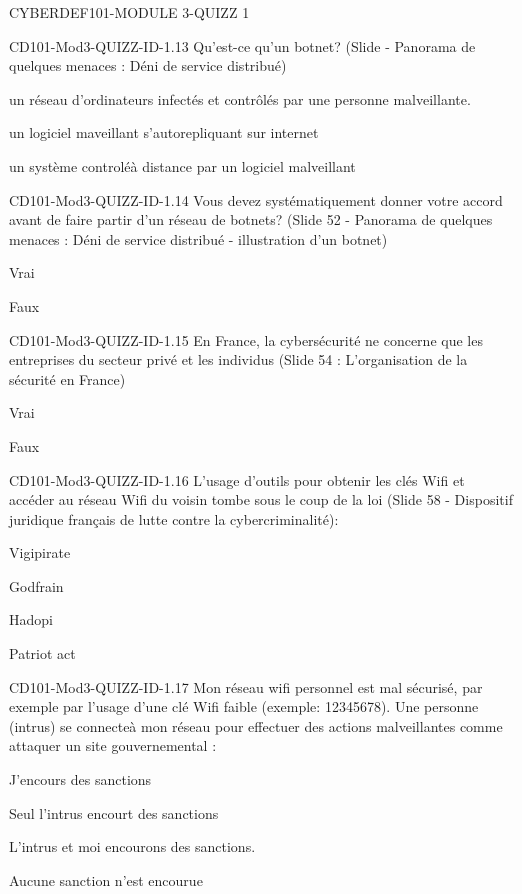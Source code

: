 \documentclass[12pt]{article}
\begin{document}
\begin{quiz}{CYBERDEF101-MODULE 3-QUIZZ 1}
\begin{multi}[multiple=true]{CD101-Mod3-QUIZZ-ID-1.13}
	Qu'est-ce qu'un botnet? (Slide -  Panorama de quelques menaces : D\'eni de service distribu\'e)
\item*  un r\'eseau d'ordinateurs infect\'es et contrôl\'es par une personne malveillante.
\item un logiciel maveillant s'autorepliquant sur internet
\item un système controlé\`a distance par un logiciel malveillant
\end{multi}

\begin{multi}[multiple=true]{CD101-Mod3-QUIZZ-ID-1.14}
	Vous devez syst\'ematiquement donner votre accord avant de faire partir d'un r\'eseau de botnets? (Slide 52 - Panorama de quelques menaces : D\'eni de service distribu\'e - illustration d'un botnet)
\item 	Vrai
\item* 	Faux
\end{multi}

\begin{multi}[multiple=true]{CD101-Mod3-QUIZZ-ID-1.15}
	En France, la cybers\'ecurit\'e ne concerne que les entreprises du secteur priv\'e et les individus (Slide 54 : L'organisation de la s\'ecurit\'e en France)
\item 	Vrai
\item* 	Faux
\end{multi}

\begin{multi}[multiple=true]{CD101-Mod3-QUIZZ-ID-1.16}
	L'usage d'outils pour obtenir les cl\'es Wifi et acc\'eder au r\'eseau  Wifi du voisin tombe sous le coup de la loi (Slide 58 - Dispositif juridique fran\c{c}ais de lutte contre la cybercriminalit\'e):
\item 	Vigipirate
\item* 	Godfrain
\item 	Hadopi
\item 	Patriot act
\end{multi}

\begin{multi}[multiple=true]{CD101-Mod3-QUIZZ-ID-1.17}
	Mon r\'eseau wifi personnel est mal s\'ecuris\'e, par exemple par l'usage d'une cl\'e Wifi faible (exemple: 12345678). Une personne (intrus) se connecte\`a mon r\'eseau  pour effectuer des actions malveillantes comme attaquer un site gouvernemental :
\item 	J'encours des sanctions
\item 	Seul l'intrus encourt des sanctions
\item* 	L'intrus et moi encourons des sanctions.
\item 	Aucune sanction n'est encourue
\end{multi}


\end{quiz}
\end{document}
